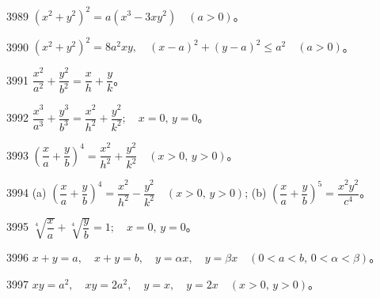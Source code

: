\begin{prob}[S]{3989}
$(x^2 + y^2)^2 = a(x^3 - 3xy^2) \quad (a > 0)$。
\end{prob}

\begin{prob}[S]{3990}
$(x^2 + y^2)^2 = 8a^2 xy, \quad (x - a)^2 + (y - a)^2 \leqslant a^2 \quad (a > 0)$。
\end{prob}


\begin{prob}[S]{3991}
$\dfrac{x^2}{a^2} + \dfrac{y^2}{b^2} = \dfrac{x}{h} + \dfrac{y}{k}$。
\end{prob}

\begin{prob}[S]{3992}
$\dfrac{x^3}{a^3} + \dfrac{y^3}{b^3} = \dfrac{x^2}{h^2} + \dfrac{y^2}{k^2}; \quad x = 0, \, y = 0$。
\end{prob}

\begin{prob}[S]{3993}
$\left(\dfrac{x}{a} + \dfrac{y}{b}\right)^4 = \dfrac{x^2}{h^2} + \dfrac{y^2}{k^2} \quad (x > 0, \, y > 0)$。
\end{prob}

\begin{prob}[M]{3994}
(a) $\left(\dfrac{x}{a} + \dfrac{y}{b}\right)^4 = \dfrac{x^2}{h^2} - \dfrac{y^2}{k^2} \quad (x > 0, \, y > 0)$; \qquad (b) $\left(\dfrac{x}{a} + \dfrac{y}{b}\right)^5 = \dfrac{x^2 y^2}{c^4}$。
\end{prob}

\begin{prob}[S]{3995}
$\sqrt[4]{\dfrac{x}{a}} + \sqrt[4]{\dfrac{y}{b}} = 1; \quad x = 0, \, y = 0$。
\end{prob}


\begin{prob}[S]{3996}
$x + y = a, \quad x + y = b, \quad y = \alpha x, \quad y = \beta x \quad (0 < a < b, \, 0 < \alpha < \beta)$。
\end{prob}

\begin{prob}[S]{3997}
$xy = a^2, \quad xy = 2a^2, \quad y = x, \quad y = 2x \quad (x > 0, \, y > 0)$。
\end{prob}

